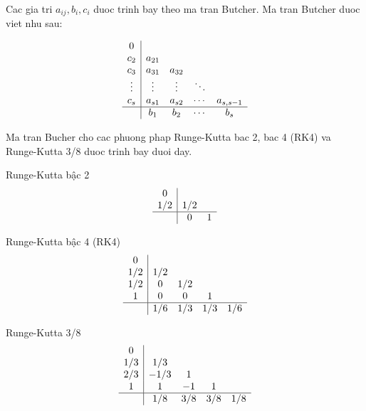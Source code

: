 Cac gia tri $a_{ij}, b_i, c_i$ duoc trinh bay theo ma tran Butcher. Ma tran Butcher duoc viet nhu sau:

\begin{equation}
\begin{array}{c|cccc}
0      &        &        &        &        \\
c_{2}  & a_{21} &        &        &        \\
c_{3}  & a_{31} & a_{32} &        &        \\
\vdots & \vdots & \vdots & \ddots &        \\
c_{s}  & a_{s1} & a_{s2} & \cdots & a_{s,s-1} \\
\hline
       & b_{1}  & b_{2}  & \cdots & b_{s}
\end{array}   
\end{equation}

Ma tran Bucher cho cac phuong phap Runge-Kutta bac 2, bac 4 (RK4) va Runge-Kutta 3/8 duoc trinh bay duoi day.

Runge-Kutta bậc 2
\begin{equation}
    \begin{array}{c|cccc}
    0 & & \\
    1/2 & 1/2 & \\
    \hline
    & 0 & 1
    \end{array}   
\end{equation}

Runge-Kutta bậc 4 (RK4)
\begin{equation}
    \begin{array}{c|cccc}
        0 & & & & \\
        1/2 & 1/2 & & & \\
        1/2 & 0 & 1/2 & & \\
        1 & 0 & 0 & 1 &\\
        \hline
        & 1/6 & 1/3 & 1/3 & 1/6
    \end{array}   
\end{equation}

Runge-Kutta 3/8
\begin{equation}
    \begin{array}{c|cccc}
        0 & & & & \\
        1/3 & 1/3 & & & \\
        2/3 & -1/3 & 1 & & \\
        1 & 1 & -1 & 1 &\\
        \hline
        & 1/8 & 3/8 & 3/8 & 1/8
    \end{array}   
\end{equation}

